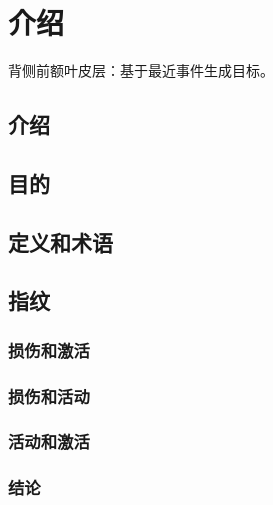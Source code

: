 \chapter{介绍}
背侧前额叶皮层：基于最近事件生成目标。

\section{介绍}

\section{目的}

\section{定义和术语}


\section{指纹}

\subsection{损伤和激活}

\subsection{损伤和活动}

\subsection{活动和激活}




\subsection{结论}



